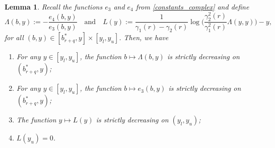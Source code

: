 \documentclass[11pt]{article} %
\newtheorem{lemma}[theorem]{Lemma}
\numberwithin{komcounter}{section}
\numberwithin{equation}{section}
\numberwithin{theorem}{section}
\begin{document}
\begin{lemma} \label{lemma_steps2dim_2}
Recall the functions $e_3$ and $e_4$ from \eqref{constants_complex} and define 
$$
\Lambda(b,y):=-\frac{e_4(b,y)}{e_3(b,y)} 
\quad \text{and} \quad 
L(y):=\frac{1}{\gamma_1(r)-\gamma_2(r)} \log\Big(\frac{\gamma_2^2(r)}{\gamma_1^2(r)}\Lambda(y,y)\Big) - y, 
\quad 
$$
for all $(b,y) \in [b_{r+q}^*,y] \times [y_l,y_u]$.
Then, we have
\begin{enumerate}[\rm (i)]
\item For any $y\in [y_l,y_u]$, the function $b \mapsto \Lambda(b,y)$ is strictly decreasing on $(b_{r+q}^*,y)$;

\item For any $y\in [y_l,y_u]$, the function $b \mapsto e_3(b,y)$ is strictly decreasing on $(b_{r+q}^*,y)$; 

\item The function $y \mapsto L(y)$ is strictly decreasing on $(y_l,y_u)$; 

\item $L(y_u)=0$.
\end{enumerate}
\end{lemma}
\end{document}
